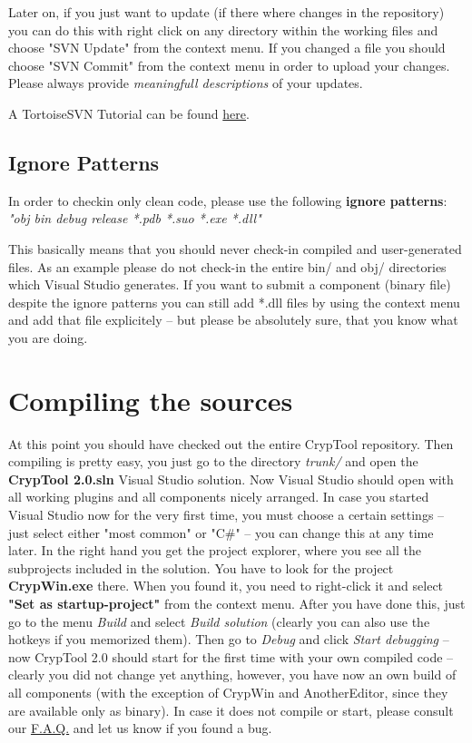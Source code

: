 Later on, if you just want to update (if there where changes in the repository) you can do this with right click on any directory within the working files and choose "SVN Update" from the context menu. If you changed a file you should choose "SVN Commit" from the context menu in order to upload your changes. Please always provide \textit{meaningfull descriptions} of your updates. 

A TortoiseSVN Tutorial can be found \href{http://www.mind.ilstu.edu/research/robots/iris4/developers/svntutorial}{here}.

\subsection*{Ignore Patterns}

In order to checkin only clean code, please use the following \textbf{ignore patterns}: \textit{"obj bin debug release *.pdb *.suo *.exe *.dll"}

This basically means that you should never check-in compiled and user-generated files. As an example please do not check-in the entire bin/ and obj/ directories which Visual Studio generates. If you want to submit a component (binary file) despite the ignore patterns you can still add *.dll files by using the context menu and add that file explicitely -- but please be absolutely sure, that you know what you are doing.

\section{Compiling the sources}

At this point you should have checked out the entire CrypTool repository. Then compiling is pretty easy, you just go to the directory \textit{trunk/} and open the \textbf{CrypTool 2.0.sln} Visual Studio solution. Now Visual Studio should open with all working plugins and all components nicely arranged. In case you started Visual Studio now for the very first time, you must choose a certain settings -- just select either "most common" or "C\#" -- you can change this at any time later. In the right hand you get the project explorer, where you see all the subprojects included in the solution. You have to look for the project \textbf{CrypWin.exe} there. When you found it, you need to right-click it and select \textbf{"Set as startup-project"} from the context menu. After you have done this, just go to the menu \textit{Build} and select \textit{Build solution} (clearly you can also use the hotkeys if you memorized them). Then go to \textit{Debug} and click \textit{Start debugging} -- now CrypTool 2.0 should start for the first time with your own compiled code -- clearly you did not change yet anything, however, you have now an own build of all components (with the exception of CrypWin and AnotherEditor, since they are available only as binary). In case it does not compile or start, please consult our \href{https://www.cryptool.org/trac/CrypTool2/wiki/FAQ}{F.A.Q.} and let us know if you found a bug. 

